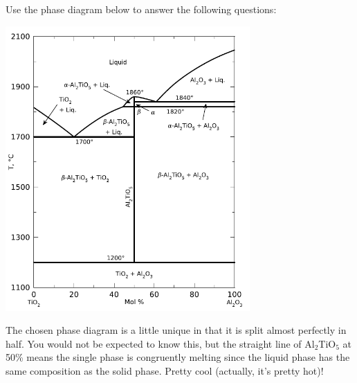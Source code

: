 \documentclass[addpoints,12pt,answers]{exam}
\begin{document}
\begin{questions}
\question Use the phase diagram below to answer the following questions:
\begin{center}
\includegraphics[width=0.7\textwidth]{phasediag.png}
\end{center}

\begin{solution}
The chosen phase diagram is a little unique in that it is split almost perfectly in half. You would not be expected to know this, but the straight line of Al$_2$TiO$_5$ at 50\% means the single phase is congruently melting since the liquid phase has the same composition as the solid phase. Pretty cool (actually, it's pretty hot)!


\end{solution}
\end{questions}
\end{document}
